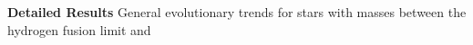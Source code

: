 \textbf{Detailed Results}
General evolutionary trends for stars with masses between the hydrogen fusion limit and 